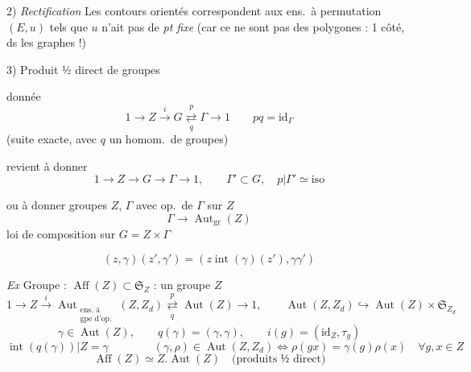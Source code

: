 \documentclass[11pt,a4paper]{article}
\begin{document}
2) \emph{Rectification} Les contours orientés correspondent aux ens.\ à
permutation $(E, u)$ tels que $u$ n'ait pas de \emph{pt fixe} (car ce ne
sont pas des polygones : 1 côté, ds les graphes !)

3) Produit ½ direct de groupes

donnée
\[
  1 \to Z \xrightarrow{i} G \underset{q}{\overset{p}{\rightleftarrows}} \Gamma \to 1
  \qquad pq = \mathrm{id}_\Gamma
\]
(suite exacte, avec $q$ un homom.\ de groupes)

revient à donner
\[
  1 \to Z \to G \to \Gamma \to 1, \qquad \Gamma' \subset G, \quad
  p|\Gamma' \simeq \text{iso}
\]

ou à donner groupes $Z$, $\Gamma$ avec op.\ de $\Gamma$ sur $Z$
\[
  \Gamma \to \operatorname{Aut}_{\mathrm{gr}}(Z)
\]
loi de composition sur $G = Z \times \Gamma$

\[
  (z, \gamma)(z', \gamma') = (z \operatorname{int}(\gamma)(z'), \gamma\gamma')
\]



\emph{Ex} Groupe  \struck{\ill{}} :
$\operatorname{Aff}(Z) \subset \mathfrak{S}_{Z}$ : un groupe $Z$
\[
  1 \to Z \xrightarrow{i} \operatorname{Aut}_{\substack{\text{ens. à} \\ \text{gpe d'op.}}}(Z, Z_d)
  \underset{q}{\overset{p}{\rightleftarrows}} \operatorname{Aut}(Z) \to 1,
  \qquad \operatorname{Aut}(Z, Z_d) \hookrightarrow \operatorname{Aut}(Z) \times \mathfrak{S}_{Z_d}
\]
\[
  \gamma \in \operatorname{Aut}(Z), \qquad q(\gamma) = (\gamma, \gamma), \qquad
  i(g) = (\mathrm{id}_Z, \tau_g)
\]
\[
  \boxed{\operatorname{int}(q(\gamma)) | Z = \gamma}
  \qquad\qquad
  (\gamma, \rho) \in \operatorname{Aut}(Z, Z_d) \Longleftrightarrow
  \rho(gx) = \gamma(g)\rho(x) \quad \forall g, x \in Z
\]
\[
  \operatorname{Aff}(Z) \simeq Z.\operatorname{Aut}(Z) \quad
  \text{(produits ½ direct)}
\]
\end{document}
